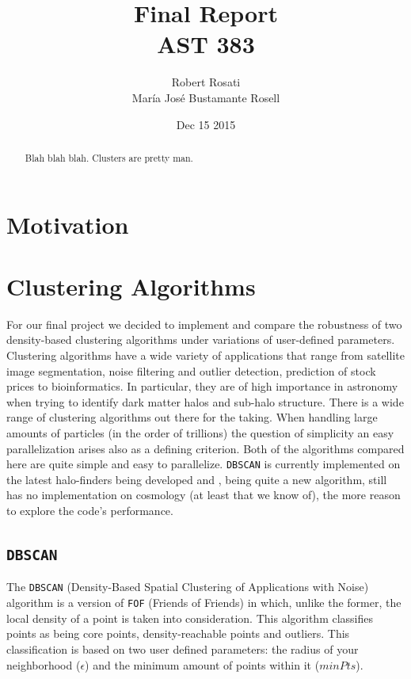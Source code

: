 \documentclass[12pt]{article}
\begin{document}
\singlespacing
\title{Final Report\\
AST 383}
\date{Dec 15 2015}
\author{Robert Rosati \\ Mar\'{i}a Jos\'{e} Bustamante Rosell}
\maketitle

\begin{abstract}
\par Blah blah blah. Clusters are pretty man.
\end{abstract}

\doublespacing
\section{Motivation}

\section{Clustering Algorithms}
\par For our final project we decided to implement and compare the robustness of two density-based clustering algorithms under variations of user-defined parameters. 
Clustering algorithms have a wide variety of applications that range from satellite image segmentation, noise filtering and outlier detection, prediction of stock prices to bioinformatics. In particular, they are of high importance in astronomy when trying to identify dark matter halos and sub-halo structure.
There is a wide range of clustering algorithms out there for the taking. When handling large amounts of particles (in the order of trillions) the question of simplicity an easy parallelization arises also as a defining criterion. Both of the algorithms compared here are quite simple and easy to parallelize. \texttt{DBSCAN} is currently implemented on the latest halo-finders being developed \cite{BDCATS} and , being quite a new algorithm, still has no implementation on cosmology (at least that we know of), the more reason to explore the code's performance.


\subsection{\texttt{DBSCAN}}

The \texttt{DBSCAN} (Density-Based Spatial Clustering of Applications with Noise) algorithm is a version of \texttt{FOF} (Friends of Friends) in which, unlike the former, the local density of a point is taken into consideration. This algorithm classifies points as being core points, density-reachable points and outliers. This classification is based on two user defined parameters: the radius of your neighborhood ($\epsilon $) and the minimum amount of points within it ($minPts$).
\end{document}
